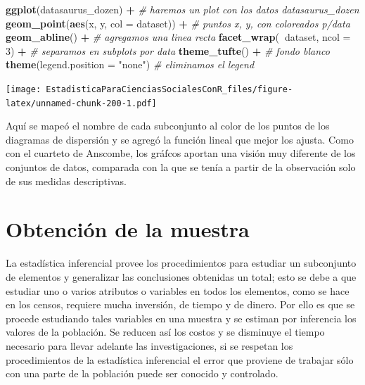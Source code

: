 \documentclass[]{book}
\newenvironment{Shaded}{\begin{snugshade}}{\end{snugshade}}
\newcommand{\CommentTok}[1]{\textcolor[rgb]{0.56,0.35,0.01}{\textit{#1}}}
\newcommand{\DataTypeTok}[1]{\textcolor[rgb]{0.13,0.29,0.53}{#1}}
\newcommand{\DecValTok}[1]{\textcolor[rgb]{0.00,0.00,0.81}{#1}}
\newcommand{\KeywordTok}[1]{\textcolor[rgb]{0.13,0.29,0.53}{\textbf{#1}}}
\newcommand{\NormalTok}[1]{#1}
\newcommand{\OperatorTok}[1]{\textcolor[rgb]{0.81,0.36,0.00}{\textbf{#1}}}
\newcommand{\StringTok}[1]{\textcolor[rgb]{0.31,0.60,0.02}{#1}}
\begin{document}
\begin{Shaded}
\begin{Highlighting}[]
\KeywordTok{ggplot}\NormalTok{(datasaurus_dozen) }\OperatorTok{+}\StringTok{ }\CommentTok{# haremos un plot con los datos datasaurus_dozen}
\StringTok{  }\KeywordTok{geom_point}\NormalTok{(}\KeywordTok{aes}\NormalTok{(x, y, }\DataTypeTok{col =}\NormalTok{ dataset)) }\OperatorTok{+}\StringTok{ }\CommentTok{# puntos x, y, con coloreados p/data}
\StringTok{  }\KeywordTok{geom_abline}\NormalTok{() }\OperatorTok{+}\StringTok{ }\CommentTok{# agregamos una linea recta}
\StringTok{  }\KeywordTok{facet_wrap}\NormalTok{(}\OperatorTok{~}\NormalTok{dataset, }\DataTypeTok{ncol =} \DecValTok{3}\NormalTok{) }\OperatorTok{+}\StringTok{ }\CommentTok{# separamos en subplots por data}
\StringTok{  }\KeywordTok{theme_tufte}\NormalTok{() }\OperatorTok{+}\StringTok{ }\CommentTok{# fondo blanco}
\StringTok{  }\KeywordTok{theme}\NormalTok{(}\DataTypeTok{legend.position =} \StringTok{"none"}\NormalTok{) }\CommentTok{# eliminamos el legend}
\end{Highlighting}
\end{Shaded}

\texttt{[image: EstadisticaParaCienciasSocialesConR\_files/figure-latex/unnamed-chunk-200-1.pdf]}

Aquí se mapeó el nombre de cada subconjunto al color de los puntos de los diagramas de dispersión y se agregó la función lineal que mejor los ajusta.
Como con el cuarteto de Anscombe, los gráfcos aportan una visión muy diferente de los conjuntos de datos, comparada con la que se tenía a partir de la observación solo de sus medidas descriptivas.

\hypertarget{obtencion-de-la-muestra}{%
\chapter{Obtención de la muestra}\label{obtencion-de-la-muestra}}

La estadística inferencial provee los procedimientos para estudiar un
subconjunto de elementos y generalizar las conclusiones obtenidas un
total; esto se debe a que estudiar uno o varios atributos o variables en
todos los elementos, como se hace en los censos, requiere mucha
inversión, de tiempo y de dinero. Por ello es que se procede estudiando
tales variables en una muestra y se estiman por inferencia los valores
de la población. Se reducen así los costos y se disminuye el tiempo
necesario para llevar adelante las investigaciones, si se respetan los
procedimientos de la estadística inferencial el error que proviene de
trabajar sólo con una parte de la población puede ser conocido y
controlado.
\end{document}
